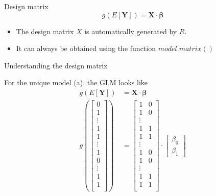 \documentclass[10pt]{beamer}
\begin{document}
\begin{frame}{Design matrix}
$$
g(E[\mathbf{Y}]) = \mathbf{X} \cdot \mathbf{\beta}
$$

\begin{itemize}
\item The design matrix $X$ is automatically generated by $R$.
\item It can always be obtained using the function $model.matrix()$
\end{itemize}
\end{frame}



\begin{frame}[fragile]{Understanding the design matrix}

For the unique model (a), the GLM  looks like 
\begin{align*}
g(E[\mathbf{Y}]) &= \mathbf{X} \cdot \mathbf{\beta}\\
    g( 
    \begin{bmatrix}
           0 \\
           1 \\
           \vdots \\
           1 \\
           1 \\
           \vdots \\
           1 \\
           0 \\
           \vdots \\
           1 \\
           1 \\
    \end{bmatrix} ) &= 
    \begin{bmatrix}
           1 & 0 \\
           1 & 0 \\
           \vdots \\
           1 & 1 \\
           1 & 1 \\
           \vdots \\
           1 & 0 \\
           1 & 0 \\
           \vdots \\
           1 & 1 \\
           1 & 1 \\
    \end{bmatrix} \cdot
    \begin{bmatrix}
           \beta_0 \\
           \beta_1 
    \end{bmatrix}
\end{align*}

\end{frame}
\end{document}
